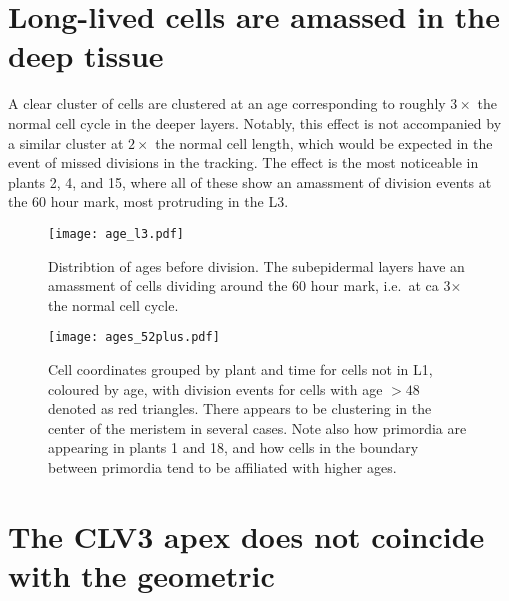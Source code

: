 \section{Long-lived cells are amassed in the deep tissue}
A clear cluster of cells are clustered at an age corresponding to roughly
$3\times$ the normal cell cycle in the deeper layers. Notably, this effect is
not accompanied by a similar cluster at $2\times$ the normal cell length, which
would be expected in the event of missed divisions in the tracking. The effect
is the most noticeable in plants 2, 4, and 15, where all of these show an
amassment of division events at the 60 hour mark, most protruding in the L3. 

\begin{figure}[H]
  \centering
  \texttt{[image: age\_l3.pdf]}
  \caption[Layer-wise age distribution]{Distribtion of ages before division. The subepidermal layers have an
    amassment of cells dividing around the 60 hour mark, i.e.\ at ca 3$\times$
    the normal cell cycle.}
  \label{fig:age}
\end{figure}

\begin{figure}[H]
  \centering
  \texttt{[image: ages\_52plus.pdf]}
  \caption[Clustering of high-longevity cells]{Cell coordinates grouped by plant and time for cells not in L1, coloured by age, with division events for cells with
    age $>48$ denoted as red triangles. There appears to be clustering in the
    center of the meristem in several cases. Note also how primordia are appearing in plants 1
    and 18, and how cells in the boundary between primordia tend to be
    affiliated with higher ages.}
  \label{fig:ages}
\end{figure}

\section{The CLV3 apex does not coincide with the geometric}

